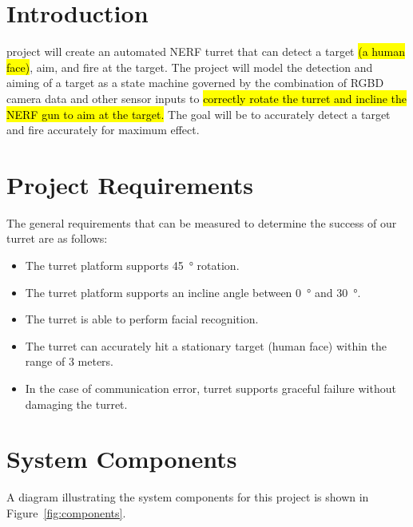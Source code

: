 \documentclass[journal]{IEEEtran}
\begin{document}

\section{Introduction}

 project will create an automated NERF turret that can detect a target \hl{(a human face)}, aim, and fire at the target. The project will model the detection and aiming of a target as a state machine governed by the combination of RGBD camera data and other sensor inputs to \hl{correctly rotate the turret and incline the NERF gun to aim at the target.} The goal will be to accurately detect a target and fire accurately for maximum effect.

\section{Project Requirements}

The general requirements that can be measured to determine the success of our turret are as follows:
\begin{itemize}
\item
The turret platform supports \SI{45}{\degree} rotation.
\item
The turret platform supports an incline angle between \SI{0}{\degree} and \SI{30}{\degree}.
\item
The turret is able to perform facial recognition.
\item
The turret can accurately hit a stationary target (human face) within the range of 3 meters.
\item
In the case of communication error, turret supports graceful failure without damaging the turret.
\end{itemize}

\section{System Components}

A diagram illustrating the system components for this project is shown in Figure~\ref{fig:components}. 
\end{document}
